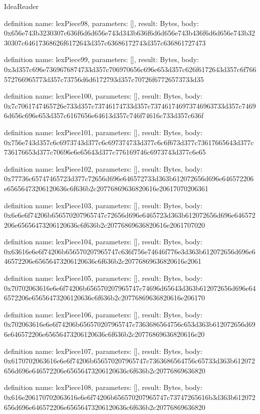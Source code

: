 \begin{lexlean}{IdeaReader}
\begin{semanticmodule}
definition{
  name: lexPiece98,
  parameters: [],
  result: Bytes,
  body: 0x656e743b3230307c636f6d6d656e743d343b636f6d6d656e743b436f6d6d656e743b3230307c64617368626f6172643d357c63686172743d357c636861727473
}

definition{
  name: lexPiece99,
  parameters: [],
  result: Bytes,
  body: 0x3d357c696e7369676874733d357c706970656c696e653d357c626f6172643d357c6f766572766965773d357c73756d6d6172793d357c70726f67726573733d35
}

definition{
  name: lexPiece100,
  parameters: [],
  result: Bytes,
  body: 0x7c7061747465726e733d357c73746174733d357c737461746973746963733d357c74696d656c696e653d357c6167656e64613d357c746f74616c733d357c636f
}

definition{
  name: lexPiece101,
  parameters: [],
  result: Bytes,
  body: 0x756e743d357c6c6973743d377c6c697374733d377c6c6f673d377c73617665643d377c736176653d377c70696e6e65643d377c776169746c6973743d377c6e65
}

definition{
  name: lexPiece102,
  parameters: [],
  result: Bytes,
  body: 0x77736c65747465723d377c72656d696e646572733d363b612072656d696e646572206e65656473206120636c6f636b2c20776869636820616e20617070206361
}

definition{
  name: lexPiece103,
  parameters: [],
  result: Bytes,
  body: 0x6e6e6f74206b656570207965747c72656d696e6465723d363b612072656d696e646572206e65656473206120636c6f636b2c20776869636820616e2061707020
}

definition{
  name: lexPiece104,
  parameters: [],
  result: Bytes,
  body: 0x63616e6e6f74206b656570207965747c636f756e74646f776e3d363b612072656d696e646572206e65656473206120636c6f636b2c20776869636820616e2061
}

definition{
  name: lexPiece105,
  parameters: [],
  result: Bytes,
  body: 0x70702063616e6e6f74206b656570207965747c74696d65643d363b612072656d696e646572206e65656473206120636c6f636b2c20776869636820616e206170
}

definition{
  name: lexPiece106,
  parameters: [],
  result: Bytes,
  body: 0x702063616e6e6f74206b656570207965747c7363686564756c653d363b612072656d696e646572206e65656473206120636c6f636b2c20776869636820616e20
}

definition{
  name: lexPiece107,
  parameters: [],
  result: Bytes,
  body: 0x6170702063616e6e6f74206b656570207965747c7363686564756c65733d363b612072656d696e646572206e65656473206120636c6f636b2c20776869636820
}

definition{
  name: lexPiece108,
  parameters: [],
  result: Bytes,
  body: 0x616e206170702063616e6e6f74206b656570207965747c73747265616b3d363b612072656d696e646572206e65656473206120636c6f636b2c20776869636820
}


\end{semanticmodule}
\end{lexlean}
